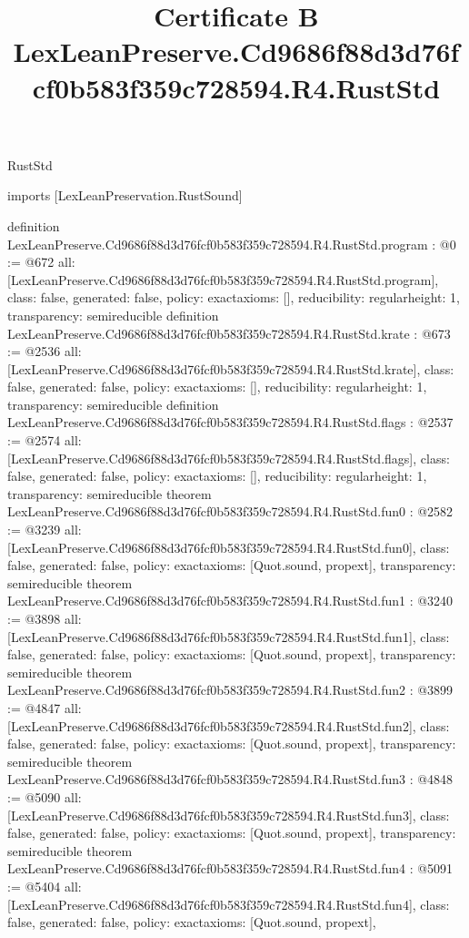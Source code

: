 \begin{lexlean}{RustStd}
\title{Certificate B LexLeanPreserve.Cd9686f88d3d76fcf0b583f359c728594.R4.RustStd}
\begin{coremodule}
imports [LexLeanPreservation.RustSound]

definition LexLeanPreserve.Cd9686f88d3d76fcf0b583f359c728594.R4.RustStd.program : @0 := @672 {
  all: [LexLeanPreserve.Cd9686f88d3d76fcf0b583f359c728594.R4.RustStd.program],
  class: false,
  generated: false,
  policy: exact{axioms: []},
  reducibility: regular{height: 1},
  transparency: semireducible
}
definition LexLeanPreserve.Cd9686f88d3d76fcf0b583f359c728594.R4.RustStd.krate : @673 := @2536 {
  all: [LexLeanPreserve.Cd9686f88d3d76fcf0b583f359c728594.R4.RustStd.krate],
  class: false,
  generated: false,
  policy: exact{axioms: []},
  reducibility: regular{height: 1},
  transparency: semireducible
}
definition LexLeanPreserve.Cd9686f88d3d76fcf0b583f359c728594.R4.RustStd.flags : @2537 := @2574 {
  all: [LexLeanPreserve.Cd9686f88d3d76fcf0b583f359c728594.R4.RustStd.flags],
  class: false,
  generated: false,
  policy: exact{axioms: []},
  reducibility: regular{height: 1},
  transparency: semireducible
}
theorem LexLeanPreserve.Cd9686f88d3d76fcf0b583f359c728594.R4.RustStd.fun0 : @2582 := @3239 {
  all: [LexLeanPreserve.Cd9686f88d3d76fcf0b583f359c728594.R4.RustStd.fun0],
  class: false,
  generated: false,
  policy: exact{axioms: [Quot.sound, propext]},
  transparency: semireducible
}
theorem LexLeanPreserve.Cd9686f88d3d76fcf0b583f359c728594.R4.RustStd.fun1 : @3240 := @3898 {
  all: [LexLeanPreserve.Cd9686f88d3d76fcf0b583f359c728594.R4.RustStd.fun1],
  class: false,
  generated: false,
  policy: exact{axioms: [Quot.sound, propext]},
  transparency: semireducible
}
theorem LexLeanPreserve.Cd9686f88d3d76fcf0b583f359c728594.R4.RustStd.fun2 : @3899 := @4847 {
  all: [LexLeanPreserve.Cd9686f88d3d76fcf0b583f359c728594.R4.RustStd.fun2],
  class: false,
  generated: false,
  policy: exact{axioms: [Quot.sound, propext]},
  transparency: semireducible
}
theorem LexLeanPreserve.Cd9686f88d3d76fcf0b583f359c728594.R4.RustStd.fun3 : @4848 := @5090 {
  all: [LexLeanPreserve.Cd9686f88d3d76fcf0b583f359c728594.R4.RustStd.fun3],
  class: false,
  generated: false,
  policy: exact{axioms: [Quot.sound, propext]},
  transparency: semireducible
}
theorem LexLeanPreserve.Cd9686f88d3d76fcf0b583f359c728594.R4.RustStd.fun4 : @5091 := @5404 {
  all: [LexLeanPreserve.Cd9686f88d3d76fcf0b583f359c728594.R4.RustStd.fun4],
  class: false,
  generated: false,
  policy: exact{axioms: [Quot.sound, propext]},
}
\end{coremodule}
\end{lexlean}
